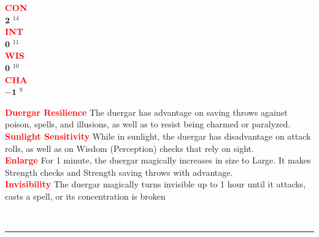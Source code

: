 \documentclass{article}
\begin{document}
\begin{adjustbox}{minipage=0.45\textwidth, margin=\fboxsep, bgimage=../images/texture2.pdf}
{\begin{minipage}[t][10.5in][t]{0.9\textwidth}
\begin{minipage}[t]{0.2\textwidth}
{            \textcolor{red}{\textbf{CON}}\\[0.1em]
            $\mathbf{2}$\,\,$^{14}$ \\[0.1em]
            \textcolor{red}{\textbf{INT}}\\[0.1em]
            $\mathbf{0}$\,\,$^{11}$ \\[0.1em]
            \textcolor{red}{\textbf{WIS}}\\[0.1em]
            $\mathbf{0}$\,\,$^{10}$ \\[0.1em]
            \textcolor{red}{\textbf{CHA}}\\[0.1em]
            $\mathbf{-1}$\,\,$^{9}$ \\[0.1em]
            }
        \end{minipage}
        \hspace{-0.1in}
        \vline
        \hspace{0.1in}
        \begin{minipage}[t]{0.7\textwidth}
            \textcolor{red}{\textbf{Duergar Resilience}} The duergar has advantage on saving throws against poison, spells, and illusions, as well as to resist being charmed or paralyzed. \\[0.2em]
            \textcolor{red}{\textbf{Sunlight Sensitivity}} While in sunlight, the duergar has disadvantage on attack rolls, as well as on Wisdom (Perception) checks that rely on sight. \\[0.2em]
            \textcolor{red}{\textbf{Enlarge}} For 1 minute, the duergar magically increases in size to Large. It makes Strength checks and Strength saving throws with advantage.  \\[0.2em]
            \textcolor{red}{\textbf{Invisibility}} The duergar magically turns invisible up to 1 hour until it attacks, casts a spell, or its concentration is broken\\[0.2em]
        \end{minipage}
        \vspace{0.025in}\\
        \rule{\textwidth}{1pt}\\
        \vspace{-0.08in}

\end{minipage}}
\end{adjustbox}
\end{document}
